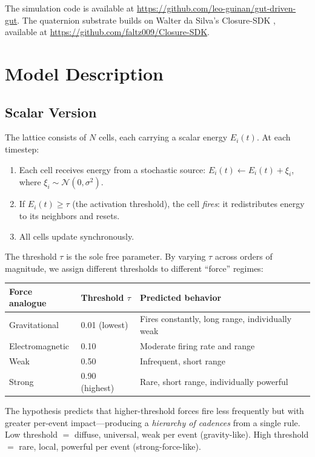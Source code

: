 \documentclass[letterpaper,12pt]{article}
\begin{document}
The simulation code is available at \url{https://github.com/leo-guinan/gut-driven-gut}. The quaternion substrate builds on Walter da Silva's Closure-SDK \cite{daSilva2025}, available at \url{https://github.com/faltz009/Closure-SDK}.

\section{Model Description}

\subsection{Scalar Version}

The lattice consists of $N$ cells, each carrying a scalar energy $E_i(t)$. At each timestep:

\begin{enumerate}
  \item Each cell receives energy from a stochastic source: $E_i(t) \leftarrow E_i(t) + \xi_i$, where $\xi_i \sim \mathcal{N}(0, \sigma^2)$.
  \item If $E_i(t) \geq \tau$ (the activation threshold), the cell \emph{fires}: it redistributes energy to its neighbors and resets.
  \item All cells update synchronously.
\end{enumerate}

The threshold $\tau$ is the sole free parameter. By varying $\tau$ across orders of magnitude, we assign different thresholds to different ``force'' regimes:

\begin{table}[ht]
\centering
\begin{tabular}{lll}
\toprule
Force analogue & Threshold $\tau$ & Predicted behavior \\
\midrule
Gravitational   & 0.01 (lowest)  & Fires constantly, long range, individually weak \\
Electromagnetic & 0.10           & Moderate firing rate and range \\
Weak            & 0.50           & Infrequent, short range \\
Strong          & 0.90 (highest) & Rare, short range, individually powerful \\
\bottomrule
\end{tabular}
\end{table}

The hypothesis predicts that higher-threshold forces fire less frequently but with greater per-event impact---producing a \emph{hierarchy of cadences} from a single rule. Low threshold $=$ diffuse, universal, weak per event (gravity-like). High threshold $=$ rare, local, powerful per event (strong-force-like).
\end{document}
